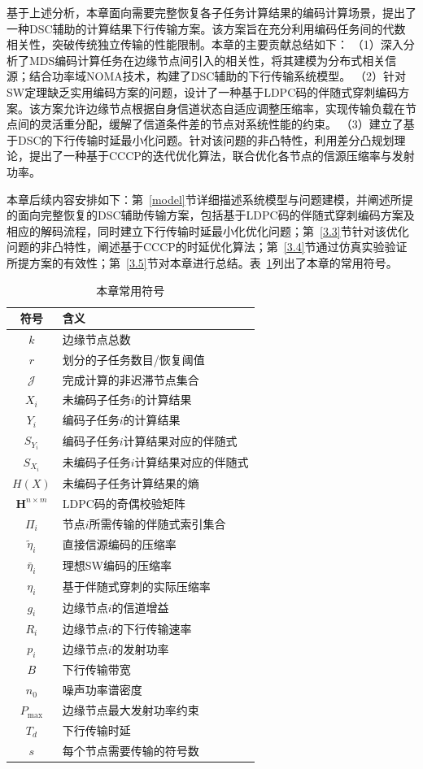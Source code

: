 基于上述分析，本章面向需要完整恢复各子任务计算结果的编码计算场景，提出了一种DSC辅助的计算结果下行传输方案。该方案旨在充分利用编码任务间的代数相关性，突破传统独立传输的性能限制。本章的主要贡献总结如下：
（1）深入分析了MDS编码计算任务在边缘节点间引入的相关性，将其建模为分布式相关信源；结合功率域NOMA技术，构建了DSC辅助的下行传输系统模型。
（2）针对SW定理缺乏实用编码方案的问题，设计了一种基于LDPC码的伴随式穿刺编码方案。该方案允许边缘节点根据自身信道状态自适应调整压缩率，实现传输负载在节点间的灵活重分配，缓解了信道条件差的节点对系统性能的约束。
（3）建立了基于DSC的下行传输时延最小化问题。针对该问题的非凸特性，利用差分凸规划理论，提出了一种基于CCCP的迭代优化算法，联合优化各节点的信源压缩率与发射功率。

本章后续内容安排如下：第~\ref{model}节详细描述系统模型与问题建模，并阐述所提的面向完整恢复的DSC辅助传输方案，包括基于LDPC码的伴随式穿刺编码方案及相应的解码流程，同时建立下行传输时延最小化优化问题；第~\ref{3.3}节针对该优化问题的非凸特性，阐述基于CCCP的时延优化算法；第~\ref{3.4}节通过仿真实验验证所提方案的有效性；第~\ref{3.5}节对本章进行总结。表~\ref{<chapter-three-table-symbols>}列出了本章的常用符号。

\begin{table}[htbp]
	\centering
	\caption{本章常用符号}
	\begin{tabular}{c p{28em}}
		\toprule
		符号 & 含义\\
		\midrule
		$k$ & 边缘节点总数 \\
		$r$ & 划分的子任务数目/恢复阈值 \\
		$\mathcal{J}$ & 完成计算的非迟滞节点集合 \\
		$X_i$ & 未编码子任务$i$的计算结果 \\
		$Y_i$ & 编码子任务$i$的计算结果 \\
		$S_{Y_i}$ & 编码子任务$i$计算结果对应的伴随式 \\
		$S_{X_i}$ & 未编码子任务$i$计算结果对应的伴随式 \\
		$H(X)$ & 未编码子任务计算结果的熵 \\
		$\mathbf{H}^{n\times m}$ & LDPC码的奇偶校验矩阵 \\
		$\Pi_i$ & 节点$i$所需传输的伴随式索引集合 \\
		$\tilde{\eta}_i$ & 直接信源编码的压缩率 \\
		$\bar{\eta}_i$ & 理想SW编码的压缩率 \\
		$\eta_i$ & 基于伴随式穿刺的实际压缩率 \\
		$g_i$ & 边缘节点$i$的信道增益 \\
		$R_i$ & 边缘节点$i$的下行传输速率 \\
		$p_i$ & 边缘节点$i$的发射功率 \\
		$B$ & 下行传输带宽 \\
		$n_0$ & 噪声功率谱密度 \\
		$P_{\max}$ & 边缘节点最大发射功率约束 \\
		$T_d$ & 下行传输时延 \\
		$s$ & 每个节点需要传输的符号数 \\
		\bottomrule
	\end{tabular}
	\label{<chapter-three-table-symbols>}
\end{table}


